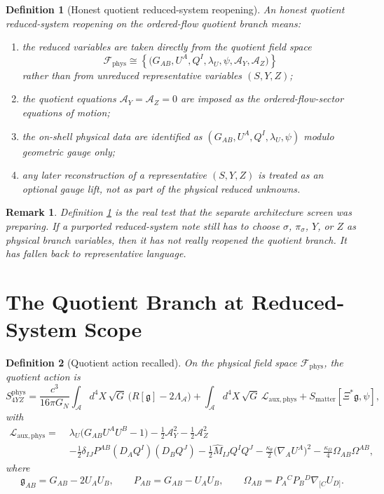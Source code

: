 \documentclass[11pt]{article}
\newcommand{\Sub}{\mathcal{A}}
\newcommand{\BridgeMetric}{\mathfrak{g}}
\newcommand{\AY}{\mathcal A_Y}
\newcommand{\AZ}{\mathcal A_Z}
\newcommand{\FieldSpace}{\mathscr F}
\newcommand{\PhysFieldSpace}{\FieldSpace_{\mathrm{phys}}}
\newtheorem{definition}{Definition}
\newtheorem{remark}{Remark}
\begin{document}
\begin{definition}[Honest quotient reduced-system reopening]
\label{def:honest}
An \emph{honest quotient reduced-system reopening} on the ordered-flow quotient branch means:
\begin{enumerate}
    \item the reduced variables are taken directly from the quotient field space
    \[
    \PhysFieldSpace
    \cong
    \left\{
    \bigl(G_{AB},U^A,Q^I,\lambda_U,\psi,\AY,\AZ\bigr)
    \right\}
    \]
    rather than from unreduced representative variables \((S,Y,Z)\);
    \item the quotient equations \(\AY=\AZ=0\) are imposed as the ordered-flow-sector equations of motion;
    \item the on-shell physical data are identified as \((G_{AB},U^A,Q^I,\lambda_U,\psi)\) modulo geometric gauge only;
    \item any later reconstruction of a representative \((S,Y,Z)\) is treated as an optional gauge lift, not as part of the physical reduced unknowns.
\end{enumerate}
\end{definition}

\begin{remark}
Definition \ref{def:honest} is the real test that the separate architecture screen was preparing. If a purported reduced-system note still has to choose \(\sigma\), \(\pi_\sigma\), \(Y\), or \(Z\) as physical branch variables, then it has not really reopened the quotient branch. It has fallen back to representative language.
\end{remark}

\section{The Quotient Branch at Reduced-System Scope}

\begin{definition}[Quotient action recalled]
\label{def:quotaction}
On the physical field space \(\PhysFieldSpace\), the quotient action is
\begin{equation}
S_{4YZ}^{\mathrm{phys}}
=
\frac{c^3}{16\pi G_N}
\int_{\Sub} d^4X\,\sqrt{G}\,\bigl(R[\BridgeMetric]-2\Lambda_{\Sub}\bigr)
+\int_{\Sub} d^4X\,\sqrt{G}\,\mathcal L_{\mathrm{aux,phys}}
+S_{\mathrm{matter}}[\Xi^*\BridgeMetric,\psi],
\label{eq:Sphys}
\end{equation}
with
\begin{align}
\mathcal L_{\mathrm{aux,phys}}
=\;&
\lambda_U\bigl(G_{AB}U^AU^B-1\bigr)
-\frac12\AY^2
-\frac12\AZ^2
\nonumber\\
&-\frac12\delta_{IJ}P^{AB}(D_AQ^I)(D_BQ^J)
-\frac12\widehat M_{IJ}Q^IQ^J
-\frac{\kappa_\theta}{2}\bigl(\nabla_AU^A\bigr)^2
-\frac{\kappa_\Omega}{4}\Omega_{AB}\Omega^{AB},
\label{eq:Lphys}
\end{align}
where
\begin{equation}
\BridgeMetric_{AB}=G_{AB}-2U_AU_B,
\qquad
P_{AB}=G_{AB}-U_AU_B,
\qquad
\Omega_{AB}=P_A{}^CP_B{}^D\nabla_{[C}U_{D]}.
\label{eq:bridge}
\end{equation}
\end{definition}
\end{document}

